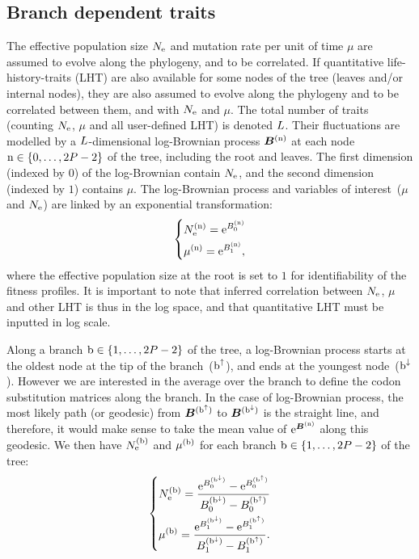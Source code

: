 \subsection{Branch dependent traits}
The effective population size $N_{\mathrm{e}}$ and mutation rate per unit of time $\mu$ are assumed to evolve along the phylogeny, and to be correlated.
If quantitative life-history-traits (LHT) are also available for some nodes of the tree (leaves and/or internal nodes), they are also assumed to evolve along the phylogeny and to be correlated between them, and with $N_{\mathrm{e}}$ and $\mu$.
The total number of traits (counting $N_{\mathrm{e}}$, $\mu$ and all user-defined LHT) is denoted $L$.
Their fluctuations are modelled by a $L$-dimensional log-Brownian process $\bm{B}^{(\text{n})}$ at each node $\text{n} \in \{0, \hdots, 2 P - 2\}$ of the tree, including the root and leaves.
The first dimension (indexed by $0$) of the log-Brownian contain $N_{\mathrm{e}}$, and the second dimension (indexed by $1$) contains $\mu$.
The log-Brownian process and variables of interest~($\mu$ and $N_{\mathrm{e}}$) are linked by an exponential transformation:
\begin{equation}
    \begin{dcases}
        N_{\mathrm{e}}^{(\text{n})} = \mathrm{e}^{ B_{0}^{(\text{n})} } \\
        \mu^{(\text{n})} = \mathrm{e}^{ B_{1}^{(\text{n})} },
    \end{dcases}
\end{equation}
where the effective population size at the root is set to $1$ for identifiability of the fitness profiles.
It is important to note that inferred correlation between $N_{\mathrm{e}}$, $\mu$ and other LHT is thus in the log space, and that quantitative LHT must be inputted in log scale.

Along a branch $\text{b} \in \{1, \hdots, 2 P - 2\}$ of the tree, a log-Brownian process starts at the oldest node at the tip of the branch~($\text{b}^{\uparrow}$), and ends at the youngest node~($\text{b}^{\downarrow}$).
However we are interested in the average over the branch to define the codon substitution matrices along the branch.
In the case of log-Brownian process, the most likely path (or geodesic) from $\bm{B}^{(\text{b}^{\uparrow})}$ to $\bm{B}^{(\text{b}^{\downarrow})}$ is the straight line, and therefore, it would make sense to take the mean value of $\mathrm{e}^{\bm{B}^{(\text{n})}}$ along this geodesic.
We then have $N_{\mathrm{e}}^{(\text{b})}$ and $\mu^{(\text{b})}$ for each branch $\text{b} \in \{1, \hdots, 2 P - 2\}$ of the tree:
\begin{equation}
    \label{eq:branchNemu}
    \begin{dcases}
        \Ne\branchexp = \dfrac{\e^{\brownian_{0}^{(\nodeDown)}} - \e^{\brownian_{0}^{(\nodeUp)}}}{\brownian_{0}^{(\nodeDown)} - \brownian_{0}^{(\nodeUp)}} \\
        \mu\branchexp = \dfrac{\e^{\brownian_{1}^{(\nodeDown)}} - \e^{\brownian_{1}^{(\nodeUp)}}}{\brownian_{1}^{(\nodeDown)} - \brownian_{1}^{(\nodeUp)}}.
    \end{dcases}
\end{equation}

